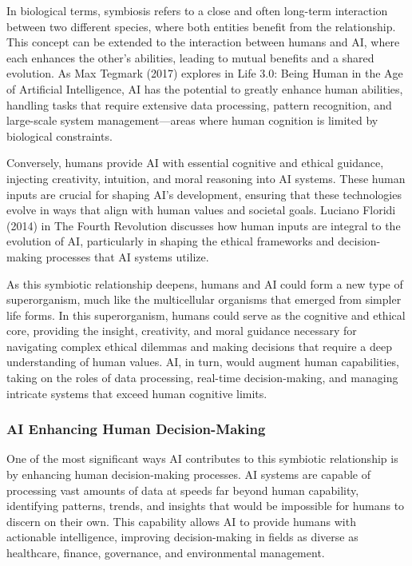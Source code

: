 \documentclass[12pt,twoside]{article}
\begin{document}
In biological terms, symbiosis refers to a close and often long-term interaction between two different species, where both entities benefit from the relationship. This concept can be extended to the interaction between humans and AI, where each enhances the other’s abilities, leading to mutual benefits and a shared evolution. As Max Tegmark (2017) explores in Life 3.0: Being Human in the Age of Artificial Intelligence, AI has the potential to greatly enhance human abilities, handling tasks that require extensive data processing, pattern recognition, and large-scale system management—areas where human cognition is limited by biological constraints.

Conversely, humans provide AI with essential cognitive and ethical guidance, injecting creativity, intuition, and moral reasoning into AI systems. These human inputs are crucial for shaping AI’s development, ensuring that these technologies evolve in ways that align with human values and societal goals. Luciano Floridi (2014) in The Fourth Revolution discusses how human inputs are integral to the evolution of AI, particularly in shaping the ethical frameworks and decision-making processes that AI systems utilize.

As this symbiotic relationship deepens, humans and AI could form a new type of superorganism, much like the multicellular organisms that emerged from simpler life forms. In this superorganism, humans could serve as the cognitive and ethical core, providing the insight, creativity, and moral guidance necessary for navigating complex ethical dilemmas and making decisions that require a deep understanding of human values. AI, in turn, would augment human capabilities, taking on the roles of data processing, real-time decision-making, and managing intricate systems that exceed human cognitive limits.

\subsubsection{AI Enhancing Human Decision-Making}

One of the most significant ways AI contributes to this symbiotic relationship is by enhancing human decision-making processes. AI systems are capable of processing vast amounts of data at speeds far beyond human capability, identifying patterns, trends, and insights that would be impossible for humans to discern on their own. This capability allows AI to provide humans with actionable intelligence, improving decision-making in fields as diverse as healthcare, finance, governance, and environmental management.
\end{document}
